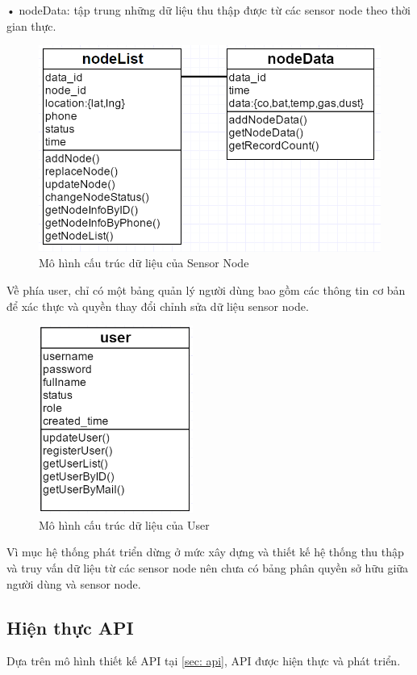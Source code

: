 • nodeData: tập trung những dữ liệu thu thập được từ các sensor node theo thời gian thực. 
\begin{figure}[H]
	\centering    
	\includegraphics[width=1.0\textwidth]{dbnode}
	\caption[Mô hình cấu trúc dữ liệu của Sensor Node]{Mô hình cấu trúc dữ liệu của Sensor Node}
	\label{fig: dbnode}
\end{figure}
Về phía user, chỉ có một bảng quản lý người dùng bao gồm các thông tin cơ bản để xác thực và quyền thay đổi chỉnh sửa dữ liệu sensor node.
\begin{figure}[H]
	\centering    
	\includegraphics[width=0.45\textwidth]{dbuser}
	\caption[Mô hình cấu trúc dữ liệu của User]{Mô hình cấu trúc dữ liệu của User}
	\label{fig: dbuser}
\end{figure}

Vì mục hệ thống phát triển dừng ở mức xây dựng và thiết kế hệ thống thu thập và truy vấn dữ liệu từ các sensor node nên chưa có bảng phân quyền sở hữu giữa người dùng và sensor node.
\subsection{Hiện thực API}
Dựa trên mô hình thiết kế API tại \ref{sec: api}, API được hiện thực và phát triển.


